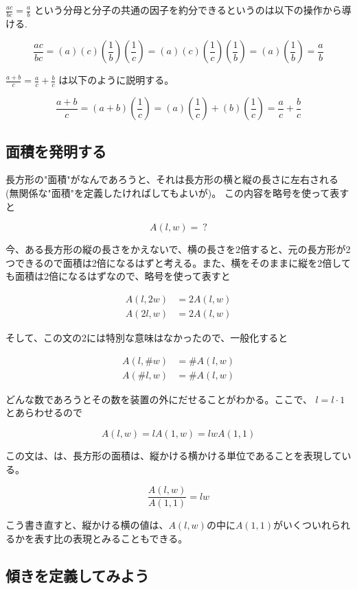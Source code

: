 \documentclass[dvipdfmx]{jsarticle}
\begin{document}
$\frac{ac}{bc} = \frac{a}{b}$ という分母と分子の共通の因子を約分できるというのは以下の操作から導ける.

\[ \frac{ac}{bc} = (a)(c)(\frac{1}{b})(\frac{1}{c}) = (a)(c)(\frac{1}{c})(\frac{1}{b}) = (a)(\frac{1}{b}) = \frac{a}{b} \]

$\frac{a + b}{c} = \frac{a}{c} + \frac{b}{c}$ は以下のように説明する。


\[ \frac{a + b}{c} = (a + b)(\frac{1}{c}) = (a)(\frac{1}{c}) + (b)(\frac{1}{c}) = \frac{a}{c} + \frac{b}{c} \]

\subsection{面積を発明する}

長方形の"面積"がなんであろうと、それは長方形の横と縦の長さに左右される(無関係な"面積"を定義したければしてもよいが)。 この内容を略号を使って表すと

\[A(l,w) =\ ?\]

今、ある長方形の縦の長さをかえないで、横の長さを2倍すると、元の長方形が2つできるので面積は2倍になるはずと考える。また、横をそのままに縦を2倍しても面積は2倍になるはずなので、略号を使って表すと

\begin{align*}
  A(l,2w) &= 2A(l,w) \\
  A(2l,w) &= 2A(l,w)
\end{align*}

そして、この文の2には特別な意味はなかったので、一般化すると

\begin{align*}
  A(l,\#w) &= \#A(l,w) \\
  A(\#l,w) &= \#A(l,w)
\end{align*}

どんな数であろうとその数を装置の外にだせることがわかる。ここで、 $l = l \cdot 1$ とあらわせるので

\[A(l,w) = lA(1,w) = lwA(1,1) \]

この文は、は、長方形の面積は、縦かける横かける単位であることを表現している。

\[ \frac{A(l,w)}{A(1,1)} = lw \]

こう書き直すと、縦かける横の値は、$A(l,w)の中にA(1,1)$がいくついれられるかを表す比の表現とみることもできる。

\subsection{傾きを定義してみよう}
\end{document}
